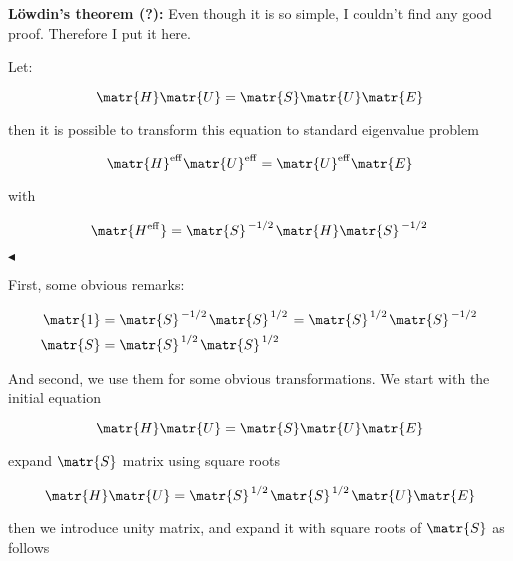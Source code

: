\textbf{L\"owdin's theorem (?):} Even though it is so simple,
I couldn't find any good proof. Therefore I put it here.

Let:

\begin{equation}
  \matr{H}\matr{U} = \matr{S}\matr{U}\matr{E}
\end{equation}

then it is possible to transform this equation to
standard eigenvalue problem

\begin{equation}
  \matr{H}^\mathrm{eff} \matr{U}^\mathrm{eff} =
  \matr{U}^\mathrm{eff} \matr{E} 
\end{equation}

with 

\begin{equation}
  \matr{H^\mathrm{eff}} = \matr{S}^{\left. {-1} \middle/ {2} \right.}
  \matr{H}\matr{S}^{\left. {-1} \middle/ {2} \right.}
\end{equation}

$\blacktriangleleft$ 

First, some obvious remarks:

\begin{equation}
  \begin{aligned}
 \matr{1} &= \matr{S}^{\left. {-1} \middle/ {2} \right.}
 \matr{S}^{\left. {1} \middle/ {2} \right.} = 
 \matr{S}^{\left. {1} \middle/ {2} \right.}
 \matr{S}^{\left. {-1} \middle/ {2} \right.} \\
 \matr{S} &=  \matr{S}^{\left. {1} \middle/ {2} \right.}
 \matr{S}^{\left. {1} \middle/ {2} \right.}
  \end{aligned}
 \label{eq:eq10}
\end{equation}

And second, we use them for some obvious transformations.
We start with the initial equation

\begin{equation}
 \matr{H}\matr{U} = \matr{S}\matr{U}\matr{E}
\end{equation}

expand $\matr{S}$ matrix using square roots

\begin{equation}
 \matr{H}\matr{U} = 
 \matr{S}^{\left. {1} \middle/ {2} \right.}
 \matr{S}^{\left. {1} \middle/ {2} \right.} 
 \matr{U}\matr{E}
  \label{ eq:eq11 }
\end{equation}

then we introduce unity matrix, and expand it with square roots of
$\matr{S}$ as follows

